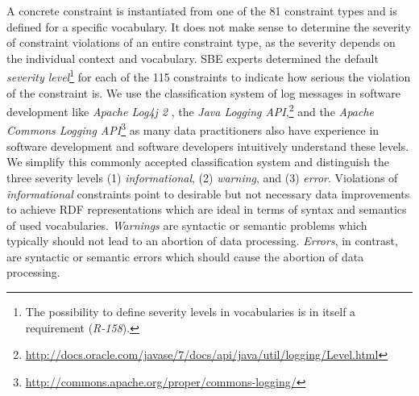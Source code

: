 \documentclass[conference]{IEEEtran}
\newcommand{\ke}[1]{\todo[size=\small, color=red!40]{\textbf{Kai:} #1}}
\begin{document}
A concrete constraint is instantiated from one of the 81 constraint types and is defined for a specific vocabulary.
It does not make sense to determine the severity of constraint violations of an entire constraint type,
as the severity depends on the individual context and vocabulary.
SBE experts determined the default \emph{severity level}\footnote{The possibility to define severity levels in vocabularies is in itself a requirement (\emph{R-158}).} for each of the 115 constraints to indicate how serious the violation of the constraint is. We use the classification system of log messages in software development like \emph{Apache Log4j 2} \cite{Apache-2015}, the \emph{Java Logging API},\footnote{\url{http://docs.oracle.com/javase/7/docs/api/java/util/logging/Level.html}} and the \emph{Apache Commons Logging API}\footnote{\url{http://commons.apache.org/proper/commons-logging/}} as many data practitioners also have experience in software development and software developers intuitively understand these levels. We simplify this commonly accepted classification system and distinguish the three severity levels (1) \emph{informational}, (2) \emph{warning}, and (3) \emph{error}.
Violations of \emph{informational} constraints point to desirable but not necessary data improvements to achieve RDF representations which are ideal in terms of syntax and semantics of used vocabularies. 
\emph{Warnings} are syntactic or semantic problems which typically should not lead to an abortion of data processing.
\emph{Errors}, in contrast, are syntactic or semantic errors which should cause the abortion of data processing. 
\end{document}
